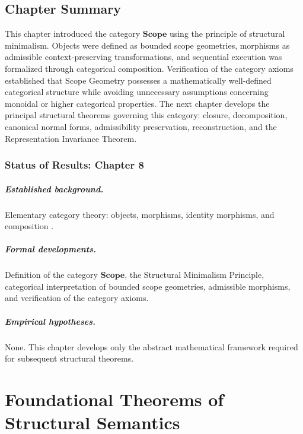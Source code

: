 \documentclass[11pt,twoside,openright]{book}
\numberwithin{equation}{chapter}
\theoremstyle{definition}
\theoremstyle{plain}
\theoremstyle{remark}
\theoremstyle{definition}
\newcommand{\CatScope}{\mathbf{Scope}}
\begin{document}
\section{Chapter Summary}

This chapter introduced the category $\CatScope$ using the principle of
structural minimalism. Objects were defined as bounded scope geometries,
morphisms as admissible context-preserving transformations, and
sequential execution was formalized through categorical composition.
Verification of the category axioms established that Scope Geometry
possesses a mathematically well-defined categorical structure while
avoiding unnecessary assumptions concerning monoidal or higher
categorical properties. The next chapter develops the principal
structural theorems governing this category: closure, decomposition,
canonical normal forms, admissibility preservation, reconstruction, and
the Representation Invariance Theorem.

\subsection*{Status of Results: Chapter 8}

\paragraph{Established background.} Elementary category theory: objects,
morphisms, identity morphisms, and composition
\cite{Eilenberg1945,MacLane1998,Awodey2010}.

\paragraph{Formal developments.} Definition of the category $\CatScope$,
the Structural Minimalism Principle, categorical interpretation of
bounded scope geometries, admissible morphisms, and verification of the
category axioms.

\paragraph{Empirical hypotheses.} None. This chapter develops only the
abstract mathematical framework required for subsequent structural
theorems.

\chapter{Foundational Theorems of Structural Semantics}
\label{ch:foundational-theorems}
\end{document}

